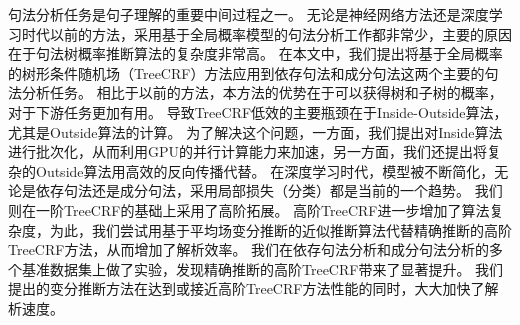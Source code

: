 
\begin{cabstract}
	句法分析任务是句子理解的重要中间过程之一。
	无论是神经网络方法还是深度学习时代以前的方法，采用基于全局概率模型的句法分析工作都非常少，主要的原因在于句法树概率推断算法的复杂度非常高。
	在本文中，我们提出将基于全局概率的树形条件随机场（TreeCRF）方法应用到依存句法和成分句法这两个主要的句法分析任务。
	相比于以前的方法，本方法的优势在于可以获得树和子树的概率，对于下游任务更加有用。
	导致TreeCRF低效的主要瓶颈在于Inside-Outside算法，尤其是Outside算法的计算。
	为了解决这个问题，一方面，我们提出对Inside算法进行批次化，从而利用GPU的并行计算能力来加速，另一方面，我们还提出将复杂的Outside算法用高效的反向传播代替。
	在深度学习时代，模型被不断简化，无论是依存句法还是成分句法，采用局部损失（分类）都是当前的一个趋势。
	我们则在一阶TreeCRF的基础上采用了高阶拓展。
	高阶TreeCRF进一步增加了算法复杂度，为此，我们尝试用基于平均场变分推断的近似推断算法代替精确推断的高阶TreeCRF方法，从而增加了解析效率。
	我们在依存句法分析和成分句法分析的多个基准数据集上做了实验，发现精确推断的高阶TreeCRF带来了显著提升。
	我们提出的变分推断方法在达到或接近高阶TreeCRF方法性能的同时，大大加快了解析速度。
	

\end{cabstract}
